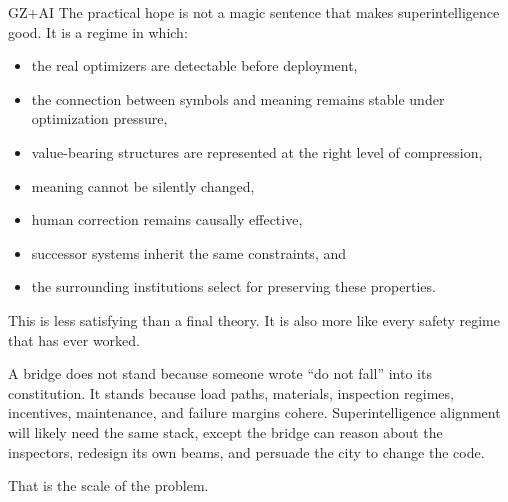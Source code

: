 \begin{authbar}{GZ+AI}
The practical hope is not a magic sentence that makes superintelligence good.
It is a regime in which:
\begin{itemize}
  \item the real optimizers are detectable before deployment,
  \item the connection between symbols and meaning remains stable under optimization pressure,
  \item value-bearing structures are represented at the right level of compression,
  \item meaning cannot be silently changed,
  \item human correction remains causally effective,
  \item successor systems inherit the same constraints, and
  \item the surrounding institutions select for preserving these properties.
\end{itemize}

This is less satisfying than a final theory.
It is also more like every safety regime that has ever worked.

A bridge does not stand because someone wrote ``do not fall'' into its constitution.
It stands because load paths, materials, inspection regimes, incentives, maintenance, and failure margins cohere.
Superintelligence alignment will likely need the same stack, except the bridge can reason about the inspectors, redesign its own beams, and persuade the city to change the code.

That is the scale of the problem.
\end{authbar}

